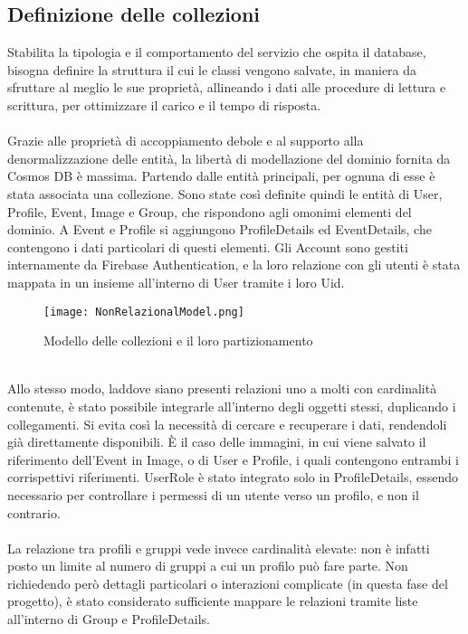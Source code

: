 \subsection{Definizione delle collezioni}

Stabilita la tipologia e il comportamento del servizio che ospita il database,
bisogna definire la struttura il cui le classi vengono salvate,
in maniera da sfruttare al meglio le sue proprietà,
allineando i dati alle procedure di lettura e scrittura,
per ottimizzare il carico e il tempo di risposta.\\
\\
Grazie alle proprietà di accoppiamento debole e al supporto alla denormalizzazione delle entità,
la libertà di modellazione del dominio fornita da Cosmos DB è massima.
Partendo dalle entità principali, per ognuna di esse è stata associata una collezione.
Sono state così definite quindi le entità di User, Profile, Event, Image e Group,
che rispondono agli omonimi elementi del dominio.
A Event e Profile si aggiungono ProfileDetails ed EventDetails,
che contengono i dati particolari di questi elementi.
Gli Account sono gestiti internamente da Firebase Authentication,
e la loro relazione con gli utenti è stata mappata in un insieme all'interno di User
tramite i loro Uid.\\
\begin{figure}[htbp]
    \centering
    \texttt{[image: NonRelazionalModel.png]}
    \caption{Modello delle collezioni e il loro partizionamento}
\end{figure}
\\
Allo stesso modo, laddove siano presenti relazioni uno a molti con cardinalità contenute,
è stato possibile integrarle all'interno degli oggetti stessi, duplicando i collegamenti.
Si evita così la necessità di cercare e recuperare i dati, 
rendendoli già direttamente disponibili.
È il caso delle immagini, in cui viene salvato il riferimento dell'Event in Image,
o di User e Profile, i quali contengono entrambi i corrispettivi riferimenti.
UserRole è stato integrato solo in ProfileDetails,
essendo necessario per controllare i permessi di un utente verso un profilo, e non il contrario.\\
\\
La relazione tra profili e gruppi vede invece cardinalità elevate:
non è infatti posto un limite al numero di gruppi a cui un profilo può fare parte.
Non richiedendo però dettagli particolari o interazioni complicate (in questa fase del progetto),
è stato considerato sufficiente mappare le relazioni tramite liste all'interno di Group e ProfileDetails.\\
